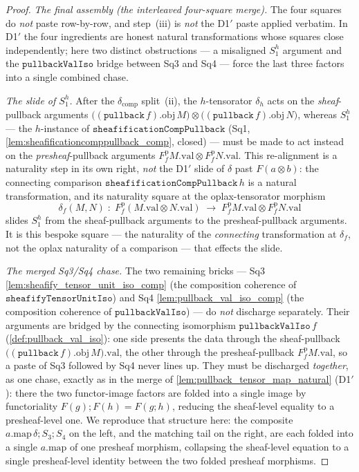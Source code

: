 \begin{proof}
  \emph{The final assembly (the interleaved four-square merge).} The four squares do \emph{not}
  paste row-by-row, and step~(iii) is \emph{not} the D1$'$ paste applied verbatim. In D1$'$
  the four ingredients are honest natural transformations whose squares close independently;
  here two distinct obstructions --- a misaligned \(S_1^{h}\) argument and the
  \(\mathtt{pullbackValIso}\) bridge between Sq3 and Sq4 --- force the last three factors into
  a single combined chase.

  \emph{The slide of \(S_1^{h}\).} After the \(\delta_{\mathrm{comp}}\) split~(ii), the
  \(h\)-tensorator \(\delta_h\) acts on the \emph{sheaf}-pullback arguments
  \(\bigl((\mathtt{pullback}\,f).\mathrm{obj}\,M\bigr) \otimes
  \bigl((\mathtt{pullback}\,f).\mathrm{obj}\,N\bigr)\), whereas \(S_1^{h}\) --- the
  \(h\)-instance of \(\mathtt{sheafificationCompPullback}\) (Sq1,
  \cref{lem:sheafificationcomppullback_comp}, closed) --- must be made to act instead on the
  \emph{presheaf}-pullback arguments \(F^{\mathrm p}_{f}M.\mathrm{val} \otimes
  F^{\mathrm p}_{f}N.\mathrm{val}\). This re-alignment is a naturality step in its own right,
  \emph{not} the D1$'$ slide of \(\delta\) past \(F(a\otimes b)\): the connecting comparison
  \(\mathtt{sheafificationCompPullback}\,h\) is a natural transformation, and its naturality
  square at the oplax-tensorator morphism
  \[
    \delta_{f}(M,N) \;:\;
      F^{\mathrm p}_{f}(M.\mathrm{val} \otimes N.\mathrm{val})
      \;\longrightarrow\;
      F^{\mathrm p}_{f}M.\mathrm{val} \otimes F^{\mathrm p}_{f}N.\mathrm{val}
  \]
  slides \(S_1^{h}\) from the sheaf-pullback arguments to the presheaf-pullback arguments.
  It is this bespoke square --- the naturality of the \emph{connecting} transformation at
  \(\delta_f\), not the oplax naturality of a comparison --- that effects the slide.

  \emph{The merged Sq3/Sq4 chase.} The two remaining bricks --- Sq3
  \cref{lem:sheafify_tensor_unit_iso_comp} (the composition coherence of
  \(\mathtt{sheafifyTensorUnitIso}\)) and Sq4 \cref{lem:pullback_val_iso_comp} (the
  composition coherence of \(\mathtt{pullbackValIso}\)) --- do \emph{not} discharge
  separately. Their arguments are bridged by the connecting isomorphism
  \(\mathtt{pullbackValIso}\,f\) (\cref{def:pullback_val_iso}): one side presents the data
  through the sheaf-pullback \(\bigl((\mathtt{pullback}\,f).\mathrm{obj}\,M\bigr).\mathrm{val}\),
  the other through the presheaf-pullback \(F^{\mathrm p}_{f}M.\mathrm{val}\), so a paste of
  Sq3 followed by Sq4 never lines up. They must be discharged \emph{together}, as one chase,
  exactly as in the merge of \cref{lem:pullback_tensor_map_natural} (D1$'$): there the two
  functor-image factors are folded into a single image by functoriality
  \(F(g)\mathbin{;}F(h)=F(g\mathbin{;}h)\), reducing the sheaf-level equality to a
  presheaf-level one. We reproduce that structure here: the composite
  \(a.\mathrm{map}\,\delta \mathbin{;} S_3 \mathbin{;} S_4\) on the left, and the matching
  tail on the right, are each folded into a single \(a.\mathrm{map}\) of one presheaf
  morphism, collapsing the sheaf-level equation to a single presheaf-level identity between
  the two folded presheaf morphisms.


\end{proof}
